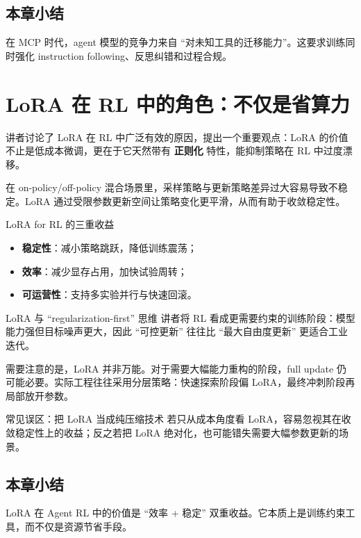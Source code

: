 \documentclass[a4paper]{article}
\begin{document}
\subsection{本章小结}
在 MCP 时代，agent 模型的竞争力来自 ``对未知工具的迁移能力''。这要求训练同时强化 instruction following、反思纠错和过程合规。

\section{LoRA 在 RL 中的角色：不仅是省算力}

讲者讨论了 LoRA 在 RL 中广泛有效的原因，提出一个重要观点：LoRA 的价值不止是低成本微调，更在于它天然带有 \textbf{正则化} 特性，能抑制策略在 RL 中过度漂移。

在 on-policy/off-policy 混合场景里，采样策略与更新策略差异过大容易导致不稳定。LoRA 通过受限参数更新空间让策略变化更平滑，从而有助于收敛稳定性。

\begin{importantbox}{LoRA for RL 的三重收益}
\begin{itemize}
    \item \textbf{稳定性}：减小策略跳跃，降低训练震荡；
    \item \textbf{效率}：减少显存占用，加快试验周转；
    \item \textbf{可运营性}：支持多实验并行与快速回滚。
\end{itemize}
\end{importantbox}

\begin{knowledgebox}{LoRA 与 ``regularization-first'' 思维}
讲者将 RL 看成更需要约束的训练阶段：模型能力强但目标噪声更大，因此 ``可控更新'' 往往比 ``最大自由度更新'' 更适合工业迭代。
\end{knowledgebox}

需要注意的是，LoRA 并非万能。对于需要大幅能力重构的阶段，full update 仍可能必要。实际工程往往采用分层策略：快速探索阶段偏 LoRA，最终冲刺阶段再局部放开参数。

\begin{warningbox}{常见误区：把 LoRA 当成纯压缩技术}
若只从成本角度看 LoRA，容易忽视其在收敛稳定性上的收益；反之若把 LoRA 绝对化，也可能错失需要大幅参数更新的场景。
\end{warningbox}

\subsection{本章小结}
LoRA 在 Agent RL 中的价值是 ``效率 + 稳定'' 双重收益。它本质上是训练约束工具，而不仅是资源节省手段。
\end{document}
